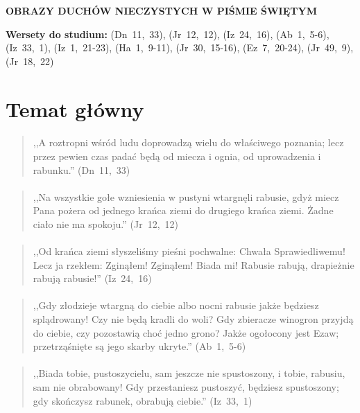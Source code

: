 \documentclass[10pt,a4paper,oneside]{article}
\begin{document}
\centerline{\textbf{\MakeUppercase{Obrazy duchów nieczystych w Piśmie Świętym}}}
\begin{center}
\textbf{Wersety do studium:} \mbox{(Dn 11, 33)}, \mbox{(Jr 12, 12)}, \mbox{(Iz 24, 16)}, \mbox{(Ab 1, 5-6)}, \mbox{(Iz 33, 1)}, \mbox{(Iz 1, 21-23)}, \mbox{(Ha 1, 9-11)}, \mbox{(Jr 30, 15-16)}, \mbox{(Ez 7, 20-24)}, \mbox{(Jr 49, 9)}, \mbox{(Jr 18, 22)}
\end{center}
\section{Temat główny}
\paragraph{}
\begin{quote}
,,A roztropni wśród ludu doprowadzą wielu do właściwego poznania; lecz przez pewien czas padać będą od miecza i ognia, od uprowadzenia i rabunku.'' \mbox{(Dn 11, 33)}
\end{quote}
\paragraph{}
\begin{quote}
,,Na wszystkie gołe wzniesienia w pustyni wtargnęli rabusie, gdyż miecz Pana pożera od jednego krańca ziemi do drugiego krańca ziemi. Żadne ciało nie ma spokoju.'' \mbox{(Jr 12, 12)}
\end{quote}
\paragraph{}
\begin{quote}
,,Od krańca ziemi słyszeliśmy pieśni pochwalne: Chwała Sprawiedliwemu! Lecz ja rzekłem: Zginąłem! Zginąłem! Biada mi! Rabusie rabują, drapieżnie rabują rabusie!'' \mbox{(Iz 24, 16)}
\end{quote}
\paragraph{}
\begin{quote}
,,Gdy złodzieje wtargną do ciebie albo nocni rabusie jakże będziesz splądrowany! Czy nie będą kradli do woli? Gdy zbieracze winogron przyjdą do ciebie, czy pozostawią choć jedno grono? Jakże ogołocony jest Ezaw; przetrząśnięte są jego skarby ukryte.'' \mbox{(Ab 1, 5-6)}
\end{quote}
\paragraph{}
\begin{quote}
,,Biada tobie, pustoszycielu, sam jeszcze nie spustoszony, i tobie, rabusiu, sam nie obrabowany! Gdy przestaniesz pustoszyć, będziesz spustoszony; gdy skończysz rabunek, obrabują ciebie.'' \mbox{(Iz 33, 1)}
\end{quote}
\end{document}
